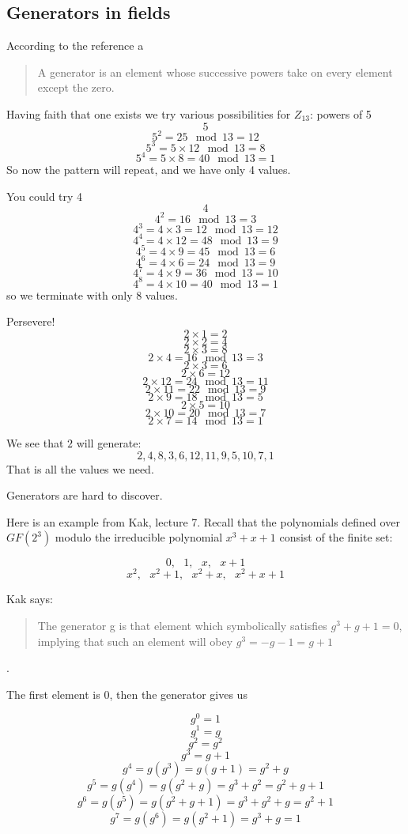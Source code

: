 \documentclass[11pt, oneside]{article}
\begin{document}
\subsection*{Generators in fields}
According to the reference a
\begin{quote}
A generator is an element whose successive powers take on every element except the zero.
\end{quote}
 Having faith that one exists we try various possibilities for $Z_{13}$:  powers of 5
 \[ 5 \]
 \[ 5^2 = 25 \mod 13 = 12 \]
 \[ 5^3 = 5 \times 12 \mod 13 = 8 \]
 \[ 5^4 = 5 \times 8 = 40 \mod 13 = 1 \]
 So now the pattern will repeat, and we have only 4 values.
 
 You could try 4
 \[ 4 \]
 \[ 4^2 = 16 \mod 13 = 3 \]
 \[ 4^3 = 4 \times 3 = 12 \mod 13 = 12 \]
 \[ 4^4 = 4 \times 12 = 48 \mod 13 = 9 \]
 \[ 4^5 = 4 \times 9 = 45 \mod 13 = 6 \]
 \[ 4^6 = 4 \times 6 = 24 \mod 13 = 9 \]
 \[ 4^7 = 4 \times 9 = 36 \mod 13 = 10 \]
 \[ 4^8 = 4 \times 10 = 40 \mod 13 = 1 \]
 so we terminate with only  8 values. 
 
 Persevere!  
 \[ 2 \times 1 = 2 \]
 \[ 2 \times 2 = 4 \]
 \[ 2 \times 3 = 8 \]
 \[ 2 \times 4 = 16 \mod 13 = 3 \]
 \[ 2 \times 3 = 6 \]
 \[ 2 \times 6 = 12 \]
 \[ 2 \times 12 = 24 \mod 13 = 11 \]
 \[ 2 \times 11 = 22 \mod 13 = 9 \]
 \[ 2 \times 9 = 18 \mod 13 = 5 \]
 \[ 2 \times 5 = 10 \]
 \[ 2 \times 10 = 20  \mod 13 = 7 \]
 \[ 2 \times 7 = 14 \mod 13 = 1 \]
 
 We see that $2$ will generate:
 \[ 2,4,8,3,6,12,11,9,5,10,7,1 \]
 That is all the values we need.
 
 Generators are hard to discover.
 
 Here is an example from Kak, lecture 7.  Recall that the polynomials defined over $GF(2^3)$ modulo the irreducible polynomial $x^3 + x + 1$ consist of the finite set:
 
 \[ 0, \ \ \ 1, \ \ \ x, \ \ \ x + 1 \]
 \[ x^2, \ \ \ x^2 + 1, \ \ \ x^2 + x, \ \ \ x^2 + x + 1 \] 
 
 Kak says:
 
 \begin{quote}The generator g is that element which symbolically satisfies $g^3 + g + 1 = 0$, implying that such an element will obey $g^3 = -g - 1 = g + 1$\end{quote}.
 
The first element is $0$, then the generator gives us

\[ g^0 = 1 \]
\[ g^1 = g \]
\[ g^2 = g^2 \]
\[ g^3 = g + 1 \]
\[ g^4 = g(g^3) = g(g + 1) = g^2 + g \]
\[ g^5 = g(g^4) = g(g^2 + g) = g^3 + g^2 = g^2 + g + 1 \]
\[ g^6 = g(g^5) = g(g^2 + g + 1) = g^3 + g^2 + g = g^2 + 1 \]
\[ g^7 = g(g^6) = g(g^2 + 1) = g^3 + g = 1 \]
\end{document}
